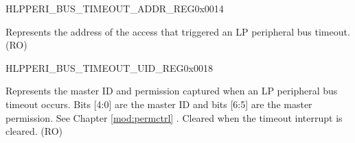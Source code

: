 \begin{register}{H}{LPPERI\_BUS\_TIMEOUT\_ADDR\_REG}{0x0014}\label{regdesc:LPPERIBUSTIMEOUTADDRREG}
%
\regnewline%
\begin{regdesc}\begin{reglist}
\label{fielddesc:LPPERILPPERITIMEOUTADDR}\item [LPPERI\_LP\_PERI\_TIMEOUT\_ADDR] Represents the address of the access that triggered an LP peripheral bus timeout. (RO)
\end{reglist}\end{regdesc}
\end{register}


\begin{register}{H}{LPPERI\_BUS\_TIMEOUT\_UID\_REG}{0x0018}\label{regdesc:LPPERIBUSTIMEOUTUIDREG}
%
%
\regnewline%
\begin{regdesc}\begin{reglist}
\label{fielddesc:LPPERILPPERITIMEOUTUID}\item [LPPERI\_LP\_PERI\_TIMEOUT\_UID] Represents the master ID and permission captured when an LP peripheral bus timeout occurs. Bits [4:0] are the master ID and bits [6:5] are the master permission. See Chapter \ref{mod:permctrl} \textit{}. Cleared when the timeout interrupt is cleared. (RO)
\end{reglist}\end{regdesc}
\end{register}


